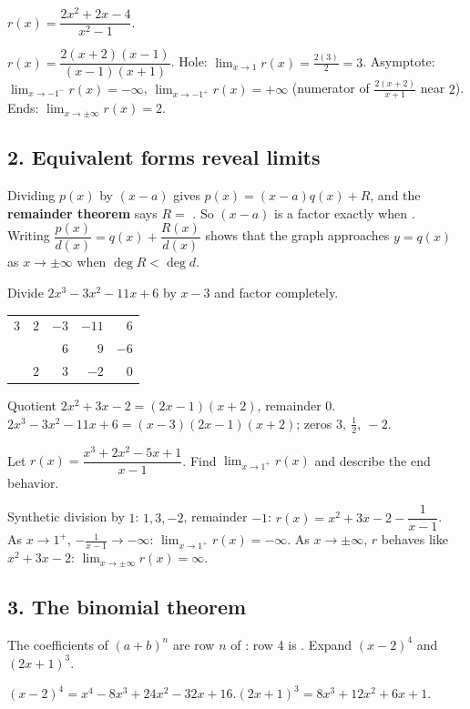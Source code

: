 $r(x)=\dfrac{2x^2+2x-4}{x^2-1}$.
\begin{workspace}[3.6cm]
$r(x)=\dfrac{2(x+2)(x-1)}{(x-1)(x+1)}$. Hole: $\lim_{x\to1}r(x)=\frac{2(3)}{2}=3$. Asymptote: $\lim_{x\to-1^-}r(x)=-\infty$, $\lim_{x\to-1^+}r(x)=+\infty$ (numerator of $\frac{2(x+2)}{x+1}$ near $2$). Ends: $\lim_{x\to\pm\infty}r(x)=2$.
\end{workspace}

\subsection*{2. Equivalent forms reveal limits}
\begin{keyidea}
Dividing $p(x)$ by $(x-a)$ gives $p(x)=(x-a)q(x)+R$, and the \textbf{remainder theorem} says $R=$ . So $(x-a)$ is a factor exactly when .\\
Writing $\dfrac{p(x)}{d(x)}=q(x)+\dfrac{R(x)}{d(x)}$ shows that the graph approaches $y=q(x)$ as $x\to\pm\infty$ when $\deg R<\deg d$.
\end{keyidea}

Divide $2x^3-3x^2-11x+6$ by $x-3$ and factor completely.
\begin{workspace}[3.4cm]
\begin{tabular}{r|rrrr}$3$&$2$&$-3$&$-11$&$6$\\&&$6$&$9$&$-6$\\\hline&$2$&$3$&$-2$&$0$\end{tabular}\qquad
Quotient $2x^2+3x-2=(2x-1)(x+2)$, remainder $0$.\\
$2x^3-3x^2-11x+6=(x-3)(2x-1)(x+2)$; zeros $3,\ \frac12,\ -2$.
\end{workspace}

Let $r(x)=\dfrac{x^3+2x^2-5x+1}{x-1}$. Find $\lim_{x\to1^+}r(x)$ and describe the end behavior.
\begin{workspace}[3cm]
Synthetic division by $1$: $1,3,-2$, remainder $-1$: $r(x)=x^2+3x-2-\dfrac{1}{x-1}$.\\
As $x\to1^+$, $-\frac{1}{x-1}\to-\infty$: $\lim_{x\to1^+}r(x)=-\infty$. As $x\to\pm\infty$, $r$ behaves like $x^2+3x-2$: $\lim_{x\to\pm\infty}r(x)=\infty$.
\end{workspace}

\subsection*{3. The binomial theorem}
The coefficients of $(a+b)^n$ are row $n$ of : row 4 is .
Expand $(x-2)^4$ and $(2x+1)^3$.
\begin{workspace}[2.4cm]
$(x-2)^4=x^4-8x^3+24x^2-32x+16$.\qquad $(2x+1)^3=8x^3+12x^2+6x+1$.
\end{workspace}

